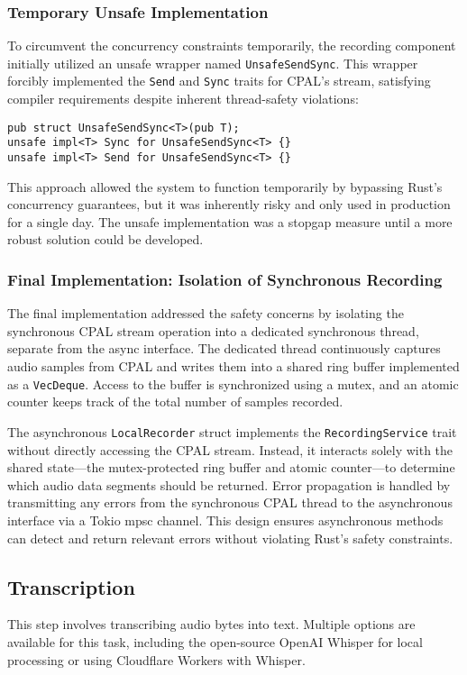 \subsubsection{Temporary Unsafe Implementation}
To circumvent the concurrency constraints temporarily, the recording component initially utilized an unsafe wrapper named \texttt{UnsafeSendSync}.
This wrapper forcibly implemented the \texttt{Send} and \texttt{Sync} traits for CPAL's stream, satisfying compiler requirements despite inherent thread-safety violations:

\begin{verbatim}
pub struct UnsafeSendSync<T>(pub T);
unsafe impl<T> Sync for UnsafeSendSync<T> {}
unsafe impl<T> Send for UnsafeSendSync<T> {}
\end{verbatim}

This approach allowed the system to function temporarily by bypassing Rust's concurrency guarantees, but it was inherently risky and only used in production for a single day. The unsafe implementation was a stopgap measure until a more robust solution could be developed.

\subsubsection{Final Implementation: Isolation of Synchronous Recording}
The final implementation addressed the safety concerns by isolating the synchronous CPAL stream operation into a dedicated synchronous thread, separate from the async interface.
The dedicated thread continuously captures audio samples from CPAL and writes them into a shared ring buffer implemented as a \texttt{VecDeque}.
Access to the buffer is synchronized using a mutex, and an atomic counter keeps track of the total number of samples recorded.

The asynchronous \texttt{LocalRecorder} struct implements the \texttt{RecordingService} trait without directly accessing the CPAL stream.
Instead, it interacts solely with the shared state—the mutex-protected ring buffer and atomic counter—to determine which audio data segments should be returned.
Error propagation is handled by transmitting any errors from the synchronous CPAL thread to the asynchronous interface via a Tokio mpsc channel.
This design ensures asynchronous methods can detect and return relevant errors without violating Rust's safety constraints.

\subsection{Transcription}
This step involves transcribing audio bytes into text. Multiple options are available for this task,
including the open-source OpenAI Whisper for local processing or using Cloudflare Workers with Whisper.

